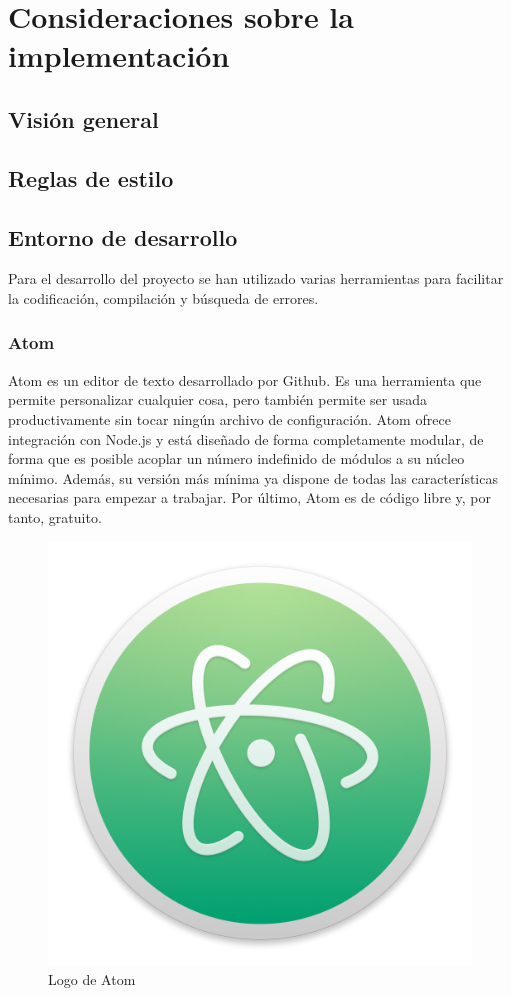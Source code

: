 \chapter{Consideraciones sobre la implementación}

\section{Visión general}

\section{Reglas de estilo}

\section{Entorno de desarrollo}

	Para el desarrollo del proyecto se han utilizado varias herramientas para facilitar la codificación, compilación y búsqueda de errores.

	\subsection{Atom}

		Atom es un editor de texto desarrollado por Github. Es una herramienta que permite personalizar cualquier cosa, pero también permite ser usada productivamente sin tocar ningún archivo de configuración. Atom ofrece integración con Node.js y está diseñado de forma completamente modular, de forma que es posible acoplar un número indefinido de módulos a su núcleo mínimo. Además, su versión más mínima ya dispone de todas las características necesarias para empezar a trabajar. Por último, Atom es de código libre y, por tanto, gratuito.

		\begin{figure}[!htp]
			 \centering
			 \includegraphics{fig/atom}
			 \caption{Logo de Atom}
			 \label{fig:atom}
		\end{figure}

